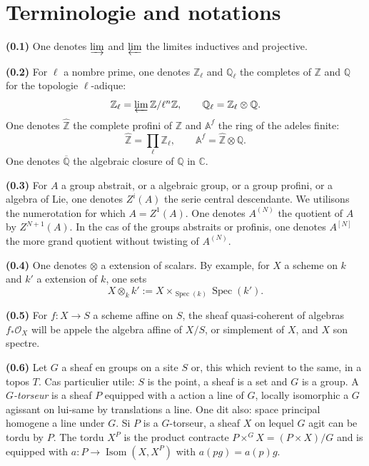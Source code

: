 \documentclass[12pt,a4paper]{article}
\theoremstyle{plain}
\theoremstyle{definition}
\theoremstyle{remark}
\DeclareMathOperator{\Spec}{Spec}
\DeclareMathOperator{\Isom}{Isom}
\providecommand{\Spec}{\operatorname{Spec}}
\providecommand{\limind}{\varinjlim}
\providecommand{\limproj}{\varprojlim}
\begin{document}
\section{Terminologie and notations}\label{sec:0}

\textbf{(0.1)} One denotes $\limind$ and $\limproj$ the limites inductives and projective.

\textbf{(0.2)} For $\ell$ a nombre prime, one denotes $\mathbb{Z}_\ell$ and $\mathbb{Q}_\ell$
the completes of $\mathbb{Z}$ and $\mathbb{Q}$ for the topologie $\ell$-adique:
\[
\mathbb{Z}_\ell = \limproj \mathbb{Z}/\ell^n\mathbb{Z}, \qquad
\mathbb{Q}_\ell = \mathbb{Z}_\ell \otimes \mathbb{Q}.
\]
One denotes $\hat{\mathbb{Z}}$ the complete profini of $\mathbb{Z}$ and $\mathbb{A}^f$
the ring of the adeles finite:
\[
\hat{\mathbb{Z}} = \prod_\ell \mathbb{Z}_\ell, \qquad
\mathbb{A}^f = \hat{\mathbb{Z}} \otimes \mathbb{Q}.
\]
One denotes $\overline{\mathbb{Q}}$ the algebraic closure of $\mathbb{Q}$ in $\mathbb{C}$.

\textbf{(0.3)} For $A$ a group abstrait, or a algebraic group, or a group
profini, or a algebra of Lie, one denotes $Z^i(A)$ the serie central descendante.
We utilisons the numerotation for which $A = Z^1(A)$. One denotes $A^{(N)}$ the
quotient of $A$ by $Z^{N+1}(A)$. In the cas of the groups abstraits or profinis, one denotes
$A^{[N]}$ the more grand quotient without twisting of $A^{(N)}$.

\textbf{(0.4)} One denotes $\otimes$ a extension of scalars. By example, for $X$ a
scheme on $k$ and $k'$ a extension of $k$, one sets
\[
X \otimes_k k' := X \times_{\Spec(k)} \Spec(k').
\]

\textbf{(0.5)} For $f: X \to S$ a scheme affine on $S$, the sheaf quasi-coherent
of algebras $f_* \mathcal{O}_X$ will be appele the algebra affine of $X/S$, or simplement of
$X$, and $X$ son spectre.

\textbf{(0.6)} Let $G$ a sheaf en groups on a site $S$ or, this which revient to the
same, in a topos $T$. Cas particulier utile: $S$ is the point, a sheaf is a
set and $G$ is a group. A \emph{$G$-torseur} is a sheaf $P$ equipped with a
action a line of $G$, locally isomorphic a $G$ agissant on lui-same by
translations a line. One dit also: space principal homogene a line under $G$.
Si $P$ is a $G$-torseur, a sheaf $X$ on lequel $G$ agit can be tordu by $P$.
The tordu $X^P$ is the product contracte $P \times^G X = (P \times X)/G$ and is equipped with
$a: P \to \Isom(X, X^P)$ with $a(pg) = a(p)g$.
\end{document}
